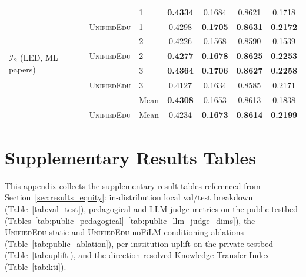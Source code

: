 \documentclass[11pt]{article}
\theoremstyle{plain}
\theoremstyle{definition}
\theoremstyle{remark}
\newcommand{\UniEdu}{\textsc{UnifiedEdu}}
\newcommand{\indiv}{\text{indiv}}
\begin{document}
\begin{table}[t]
\begin{tabular}{ll l cccc}
\midrule
\multirow{8}{*}{$\mathcal{I}_2$ (LED, ML papers)}
  & \indiv    & 1     & \textbf{0.4334} & 0.1684 & 0.8621 & 0.1718 \\
  & \UniEdu{} & 1     & 0.4298 & \textbf{0.1705} & \textbf{0.8631} & \textbf{0.2172} \\
  & \indiv    & 2     & 0.4226 & 0.1568 & 0.8590 & 0.1539 \\
  & \UniEdu{} & 2     & \textbf{0.4277} & \textbf{0.1678} & \textbf{0.8625} & \textbf{0.2253} \\
  & \indiv    & 3     & \textbf{0.4364} & \textbf{0.1706} & \textbf{0.8627} & \textbf{0.2258} \\
  & \UniEdu{} & 3     & 0.4127 & 0.1634 & 0.8585 & 0.2171 \\
  & \indiv    & Mean  & \textbf{0.4308} & 0.1653 & 0.8613 & 0.1838 \\
  & \UniEdu{} & Mean  & 0.4234 & \textbf{0.1673} & \textbf{0.8614} & \textbf{0.2199} \\
\bottomrule
\end{tabular}
\end{table}

\section{Supplementary Results Tables}
\label{app:supp_results}

This appendix collects the supplementary result
tables referenced from
Section~\ref{sec:results_equity}: in-distribution
local val/test breakdown
(Table~\ref{tab:val_test}), pedagogical and
LLM-judge metrics on the public testbed
(Tables~\ref{tab:public_pedagogical}--\ref{tab:public_llm_judge_dims}),
the \UniEdu{}-static and \UniEdu{}-noFiLM
conditioning ablations
(Table~\ref{tab:public_ablation}), per-institution
uplift on the private testbed
(Table~\ref{tab:uplift}), and the
direction-resolved Knowledge Transfer Index
(Table~\ref{tab:kti}).
\end{document}
